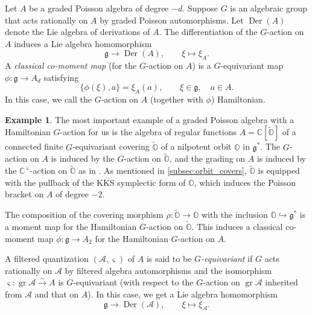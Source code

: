 \documentclass[11pt, a4paper]{amsart}
\newcommand{\C}{\mathbb{C}}
\newcommand{\g}{\mathfrak{g}}
\newcommand{\orb}{\mathbb{O}}
\newcommand{\gr}{\operatorname{gr}}
\newcommand{\fg}{\mathfrak{g}}
\newcommand{\cA}{\mathcal{A}}
\DeclareMathOperator{\der}{Der}
\newcommand{\cm}{\C^\times}
\theoremstyle{definition}
\newtheorem{Ex}[Thm]{Example}
\numberwithin{equation}{section}
\begin{document}
Let $A$ be a graded Poisson algebra of degree $-d$. Suppose $G$ is an algebraic group that acts rationally on $A$ by graded Poisson automorphisms. Let $\der(A)$ denote the Lie algebra of derivations of $A$. The differentiation of the $G$-action on $A$ induces a Lie algebra homomorphism
%
\[\fg \to \der(A), \qquad \xi \mapsto \xi_A.\]
%
A \emph{classical co-moment map} (for the $G$-action on $A$) is a $G$-equivariant map $\phi: \g \to A_d$ satisfying
%
\[\{\phi(\xi), a\} = \xi_A(a), \qquad \xi \in \fg, \quad a \in A.\] 
%
In this case, we call the $G$-action on $A$ (together with $\phi$) Hamiltonian.

\begin{Ex} \label{ex:orbit_cover}
The most important example of a graded Poisson algebra with a Hamiltonian $G$-action for us is the algebra of regular functions $A=\C[\widetilde{\orb}]$ of a connected finite $G$-equivariant covering $\widetilde{\orb}$ of a nilpotent orbit $\orb$ in $\g^*$. The $G$-action on $A$ is induced by the $G$-action on $\widetilde{\orb}$, and the grading on $A$ is induced by the $\cm$-action on $\widetilde{\orb}$ as in . As mentioned in \cref{subsec:orbit_covers}, $\widetilde{\orb}$ is equipped with the pullback of the KKS symplectic form of $\orb$, which induces the Poisson bracket on $A$ of degree $-2$. 

The composition of the covering morphism $\rho: \widetilde{\orb} \to \orb$ with the inclusion $\orb \hookrightarrow \g^*$ is a moment map for the Hamiltonian $G$-action on $\widetilde{\orb}$. This induces a classical co-moment map $\phi: \g \to A_2$ for the Hamiltonian $G$-action on $A$.
\end{Ex}


A filtered quantization $(\cA,\varsigma)$ of $A$ is said to be \emph{$G$-equivariant} if $G$ acts rationally on $\cA$ by filtered algebra automorphisms and the isomorphism $\varsigma: \gr\cA \xrightarrow{\sim} A$ is $G$-equivariant (with respect to the $G$-action on $\gr\cA$ inherited from $\cA$ and that on $A$). In this case, we get a Lie algebra homomorphism
%
\[\fg \to \der(\cA), \qquad \xi \mapsto \xi_{\cA}.\]
%
\end{document}
